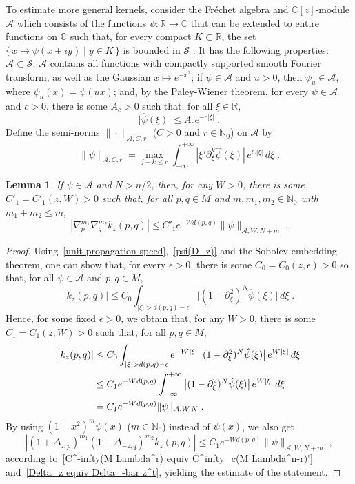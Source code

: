 \documentclass{memo-l}
\theoremstyle{plain}
\newtheorem{lem}[thm]{Lemma}
\theoremstyle{definition}
\theoremstyle{remark}
\newcommand{\C}{\mathbb{C}}
\newcommand{\N}{\mathbb{N}}
\newcommand{\R}{\mathbb{R}}
\renewcommand{\AA}{\mathcal{A}}
\renewcommand{\SS}{\mathcal{S}}
\numberwithin{section}{chapter}
\numberwithin{equation}{section}%
\begin{document}
To estimate more general kernels, consider the Fr\'echet algebra and $\C[z]$-module $\AA$ \index{$\AA$} which consists of the functions $\psi:\R\to\C$ that can be extended to entire functions on $\C$ such that, for every compact $K\subset\R$, the set $\{\,x\mapsto \psi(x+iy)\mid y\in K\,\}$ is bounded in $\SS$ \cite[Section~4]{Roe1987}. It has the following properties: $\AA\subset\SS$; $\AA$ contains all functions with compactly supported smooth Fourier transform, as well as the Gaussian $x\mapsto e^{-x^2}$; if $\psi\in\AA$ and $u>0$, then $\psi_u\in\AA$, where $\psi_u(x)=\psi(ux)$; and, by the Paley-Wiener theorem, for every $\psi\in\AA$ and $c>0$, there is some $A_c>0$ such that, for all $\xi\in\R$,
\begin{equation}\label{|hat psi(xi)| le A_c e^-c |xi|}
\big|\hat\psi(\xi)\big|\le A_ce^{-c|\xi|}\;.
\end{equation}
Define the semi-norms $\|{\cdot}\|_{\AA,C,r}$ ($C>0$ and $r\in\N_0$) on $\AA$ by
\[
\|\psi\|_{\AA,C,r}=\max_{j+k\le r} \int_{-\infty}^{+\infty}|\xi^j\partial^k_{\xi}\hat{\psi}(\xi)|\,e^{C|\xi|}\,d\xi\;.
\]

\begin{lem}\label{l: exponential decay}
If $\psi\in\AA$ and $N>n/2$, then, for any $W>0$, there is some $C'_1=C'_1(z,W)>0$ such that, for all $p,q\in M$ and $m,m_1,m_2\in\N_0$ with $m_1+m_2\le m$,
\[
|\nabla_p^{m_1}\nabla_q^{m_2}k_z(p,q)|\le C'_1 e^{-Wd(p,q)}  \|\psi\|_{\AA, W,N+m}\;.
\]
\end{lem}

\begin{proof}
Using~\eqref{unit propagation speed},~\eqref{psi(D_z)} and the Sobolev embedding theorem, one can show that, for every $\epsilon>0$, there is some $C_0=C_0(z,\epsilon)>0$ so that, for all $\psi\in \AA$ and $p,q\in M$,
\[
|k_z(p,q)|\le C_0\int_{|\xi|>d(p,q)-\epsilon} \big|(1-\partial_\xi^2)^N\hat\psi(\xi)\big|\,d\xi\;.
\]
Hence, for some fixed $\epsilon>0$, we obtain that, for any $W>0$, there is some $C_1=C_1(z,W)>0$ such that, for all $p,q\in M$, 
\begin{align*}
|k_z(p,q)| &\le C_0\int_{|\xi|>d(p,q)-\epsilon}  e^{-W|\xi|}\,\big|(1-\partial_\xi^2)^N\hat\psi(\xi)\big|\, e^{W|\xi|}\,d\xi \notag\\ 
&\le C_1 e^{-Wd(p,q)}  \int_{-\infty}^{+\infty}\big|(1-\partial_\xi^2)^N\hat\psi(\xi)\big|\, e^{W|\xi|} \,d\xi \notag\\
&= C_1 e^{-Wd(p,q)}  \|\psi\|_{\AA, W,N}\;.
\end{align*}
By using $(1+x^2)^m\psi(x)$ ($m\in\N_0$) instead of $\psi(x)$, we also get
\[
|(1+\Delta_{z,p})^{m_1}(1+\Delta_{-z,q})^{m_2}k_z(p,q)|\le C_1 e^{-Wd(p,q)}\|\psi\|_{\AA, W,N+m}\;,
\]
according to~\eqref{C^-infty(M Lambda^r) equiv C^infty_c(M Lambda^n-r)'} and~\eqref{Delta_z equiv Delta_-bar z^t}, yielding the estimate of the statement.
\end{proof}
\end{document}
